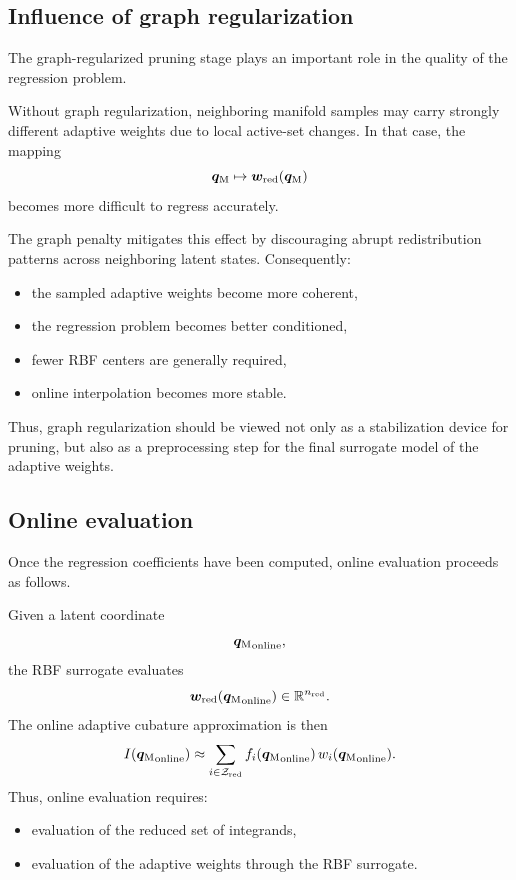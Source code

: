 \documentclass[11pt,a4paper]{article}
\begin{document}
\subsection{Influence of graph regularization}

The graph-regularized pruning stage plays an important role in the quality of
the regression problem.

Without graph regularization, neighboring manifold samples may carry strongly
different adaptive weights due to local active-set changes. In that case, the
mapping
\[
        \bm q_{\mathrm{M}}\mapsto\bm w_{\mathrm{red}}(\bm q_{\mathrm{M}})
\]
becomes more difficult to regress accurately.

The graph penalty mitigates this effect by discouraging abrupt redistribution
patterns across neighboring latent states. Consequently:
\begin{itemize}
    \item the sampled adaptive weights become more coherent,
    \item the regression problem becomes better conditioned,
    \item fewer RBF centers are generally required,
    \item online interpolation becomes more stable.
\end{itemize}

Thus, graph regularization should be viewed not only as a stabilization device
for pruning, but also as a preprocessing step for the final surrogate model of
the adaptive weights.

\subsection{Online evaluation}

Once the regression coefficients have been computed, online evaluation proceeds
as follows.

Given a latent coordinate
\[
        {\bm q_{\mathrm{M}}}_{\mathrm{online}},
\]
the RBF surrogate evaluates
\[
        \bm w_{\mathrm{red}}({\bm q_{\mathrm{M}}}_{\mathrm{online}})
        \in
        \mathbb{R}^{n_{\mathrm{red}}}.
\]
The online adaptive cubature approximation is then
\[
        I({\bm q_{\mathrm{M}}}_{\mathrm{online}})
        \approx
        \sum_{i\in\mathcal{Z}_{\mathrm{red}}}
        f_i({\bm q_{\mathrm{M}}}_{\mathrm{online}})
        \,
        w_i({\bm q_{\mathrm{M}}}_{\mathrm{online}}).
\]
Thus, online evaluation requires:
\begin{itemize}
    \item evaluation of the reduced set of integrands,
    \item evaluation of the adaptive weights through the RBF surrogate.
\end{itemize}
\end{document}
